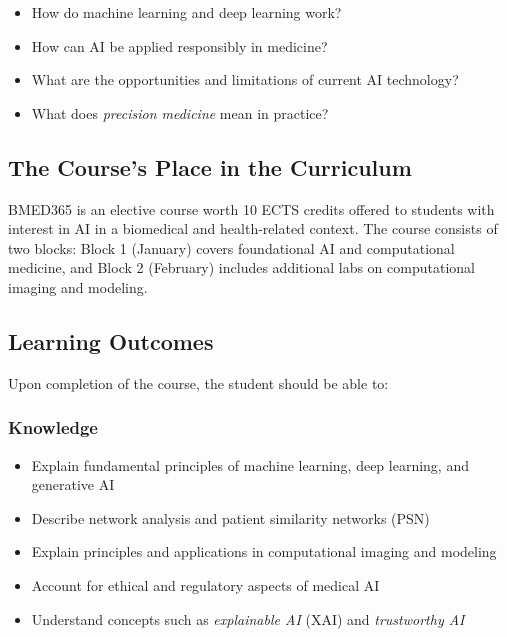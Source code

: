 \documentclass[11pt,a4paper]{article}
\begin{document}
\begin{infobox}
\begin{itemize}[nosep]
    \item How do machine learning and deep learning work?
    \item How can AI be applied responsibly in medicine?
    \item What are the opportunities and limitations of current AI technology?
    \item What does \emph{precision medicine} mean in practice?
\end{itemize}
\end{infobox}

\subsection{The Course's Place in the Curriculum}

BMED365 is an elective course worth 10 ECTS credits offered to students with interest in AI in a biomedical and health-related context. The course consists of two blocks: Block 1 (January) covers foundational AI and computational medicine, and Block 2 (February) includes additional labs on computational imaging and modeling.

\subsection{Learning Outcomes}

Upon completion of the course, the student should be able to:

\subsubsection*{Knowledge}
\begin{itemize}[nosep]
    \item Explain fundamental principles of machine learning, deep learning, and generative AI
    \item Describe network analysis and patient similarity networks (PSN)
    \item Explain principles and applications in computational imaging and modeling
    \item Account for ethical and regulatory aspects of medical AI
    \item Understand concepts such as \emph{explainable AI} (XAI) and \emph{trustworthy AI}
\end{itemize}
\end{document}

